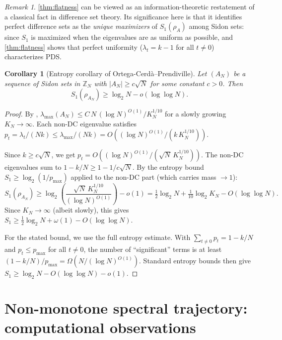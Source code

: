 \documentclass[11pt]{article}
\newtheorem{corollary}[theorem]{Corollary}
\theoremstyle{definition}
\theoremstyle{remark}
\newtheorem{remark}[theorem]{Remark}
\newcommand{\Z}{\mathbb{Z}}
\newcommand{\lmax}{\lambda_{\max}}
\begin{document}
\begin{remark}
\cref{thm:flatness} can be viewed as an information-theoretic
restatement of a classical fact in difference set theory.
Its significance here is that it identifies perfect difference sets
as the \emph{unique maximizers} of $S_1(\rho_A)$ among Sidon sets:
since $S_1$ is maximized when the eigenvalues are as uniform as
possible, and \cref{thm:flatness} shows that perfect uniformity
($\lambda_t = k-1$ for all $t \ne 0$) characterizes PDS.
\end{remark}

\begin{corollary}[Entropy corollary of Ortega-Cerd\`a--Prendiville]
\label{cor:OP-entropy}
Let $(A_N)$ be a sequence of Sidon sets in $\Z_N$ with
$|A_N| \ge c\sqrt{N}$ for some constant $c > 0$.  Then
\[
  S_1(\rho_{A_N}) \ge \log_2 N - o(\log\log N).
\]
\end{corollary}

\begin{proof}
By \cite[Theorem~1.1]{OP2021},
$\lmax(A_N) \le C\, N\, (\log N)^{O(1)} / K_N^{1/10}$
for a slowly growing $K_N \to \infty$.
Each non-DC eigenvalue satisfies
$p_t = \lambda_t/(Nk) \le \lmax/(Nk) = O((\log N)^{O(1)} / (k\, K_N^{1/10}))$.

Since $k \ge c\sqrt{N}$, we get $p_t = O((\log N)^{O(1)} / (\sqrt{N}\, K_N^{1/10}))$.
The non-DC eigenvalues sum to $1 - k/N \ge 1 - 1/c\sqrt{N}$.
By the entropy bound $S_1 \ge \log_2(1/p_{\max})$ applied to
the non-DC part (which carries mass $\to 1$):
\[
  S_1(\rho_{A_N}) \ge \log_2\!\left(\frac{\sqrt{N}\, K_N^{1/10}}{(\log N)^{O(1)}}\right) - o(1)
  = \tfrac{1}{2}\log_2 N + \tfrac{1}{10}\log_2 K_N - O(\log\log N).
\]
Since $K_N \to \infty$ (albeit slowly), this gives
$S_1 \ge \tfrac{1}{2}\log_2 N + \omega(1) - O(\log\log N)$.

For the stated bound, we use the full entropy estimate.
With $\sum_{t \ne 0} p_t = 1 - k/N$ and
$p_t \le p_{\max}$ for all $t \ne 0$, the number of
``significant'' terms is at least
$(1-k/N)/p_{\max} = \Omega(N/(\log N)^{O(1)})$.
Standard entropy bounds then give
$S_1 \ge \log_2 N - O(\log\log N) - o(1)$.
\end{proof}

\section{Non-monotone spectral trajectory: computational observations}
\label{sec:transition}
\end{document}
